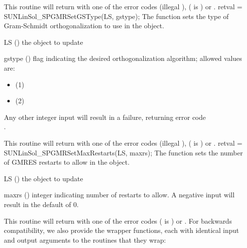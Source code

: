 {
  This routine will return with one of the error codes
   (illegal ), 
  ( is ) or .
}
{
}
{
  retval = SUNLinSol\_SPGMRSetGSType(LS, gstype);
}
{
  The function  sets the type of
  Gram-Schmidt orthogonalization to use in the {\sunlinsolspgmr}
  object. 
}
{
  \begin{args}[gstype]
  \item[LS] ()
    the {\sunlinsolspgmr} object to update
  \item[gstype] ()
    flag indicating the desired orthogonalization algorithm; allowed 
    values are:
    \begin{itemize}
    \item {} (1)
    \item {} (2)
    \end{itemize}
    Any other integer input will result in a
    failure, returning error code \\ \noindent {}.
  \end{args}
}
{
  This routine will return with one of the error codes
   (illegal ), 
  ( is ) or .
}
{
}
{
  retval = SUNLinSol\_SPGMRSetMaxRestarts(LS, maxrs);
}
{
  The function  sets the number of
  GMRES restarts to allow in the {\sunlinsolspgmr} object. 
}
{
  \begin{args}[maxrs]
  \item[LS] ()
    the {\sunlinsolspgmr} object to update
  \item[maxrs] ()
    integer indicating number of restarts to allow.  A negative input
    will result in the default of 0. 
  \end{args}
}
{
  This routine will return with one of the error codes
   ( is ) or .
}
{
}
For backwards compatibility, we also provide the wrapper functions,
each with identical input and output arguments to the routines that
they wrap:
